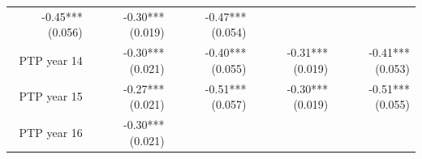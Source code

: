 \documentclass[]{article}
\begin{document}
\begin{longtable}[c]{@{}rrrrr@{}}
\begin{minipage}[t]{0.16\columnwidth}
-0.45*** (0.056)
\strut\end{minipage} &
\begin{minipage}[t]{0.21\columnwidth}\raggedleft\strut
-0.30*** (0.019)
\strut\end{minipage} &
\begin{minipage}[t]{0.15\columnwidth}\raggedleft\strut
-0.47*** (0.054)
\strut\end{minipage}\tabularnewline
\begin{minipage}[t]{0.17\columnwidth}\raggedleft\strut
PTP year 14
\strut\end{minipage} &
\begin{minipage}[t]{0.18\columnwidth}\raggedleft\strut
-0.30*** (0.021)
\strut\end{minipage} &
\begin{minipage}[t]{0.16\columnwidth}\raggedleft\strut
-0.40*** (0.055)
\strut\end{minipage} &
\begin{minipage}[t]{0.21\columnwidth}\raggedleft\strut
-0.31*** (0.019)
\strut\end{minipage} &
\begin{minipage}[t]{0.15\columnwidth}\raggedleft\strut
-0.41*** (0.053)
\strut\end{minipage}\tabularnewline
\begin{minipage}[t]{0.17\columnwidth}\raggedleft\strut
PTP year 15
\strut\end{minipage} &
\begin{minipage}[t]{0.18\columnwidth}\raggedleft\strut
-0.27*** (0.021)
\strut\end{minipage} &
\begin{minipage}[t]{0.16\columnwidth}\raggedleft\strut
-0.51*** (0.057)
\strut\end{minipage} &
\begin{minipage}[t]{0.21\columnwidth}\raggedleft\strut
-0.30*** (0.019)
\strut\end{minipage} &
\begin{minipage}[t]{0.15\columnwidth}\raggedleft\strut
-0.51*** (0.055)
\strut\end{minipage}\tabularnewline
\begin{minipage}[t]{0.17\columnwidth}\raggedleft\strut
PTP year 16
\strut\end{minipage} &
\begin{minipage}[t]{0.18\columnwidth}\raggedleft\strut
-0.30*** (0.021)
\strut\end{minipage} &
\begin{minipage}[t]{0.16\columnwidth}\raggedleft\strut

\end{minipage}
\end{longtable}
\end{document}
